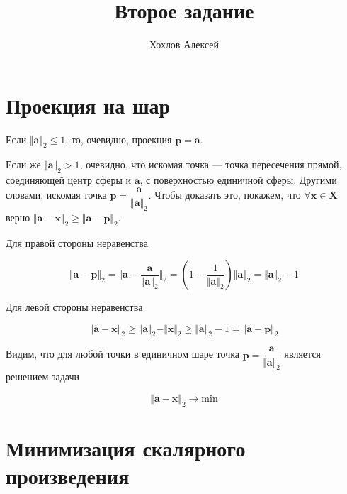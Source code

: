 
\title{Второе задание}
\author{
	Хохлов Алексей \\
}


	\maketitle
	

	\section{Проекция на шар}
	
	Если $\Vert \mathbf{a} \Vert_2 \leqslant 1$, то, очевидно, проекция $\mathbf{p} = \mathbf{a}$.
	
	Если же $\Vert \mathbf{a} \Vert_2 > 1$, очевидно, что искомая точка --- точка пересечения прямой, соединяющей центр сферы и $\mathbf{a}$, с поверхностью единичной сферы. Другими словами, искомая точка $\mathbf{p} = \dfrac{\mathbf{a}}{\Vert \mathbf{a} \Vert_2 }$. Чтобы доказать это, покажем, что $\forall \mathbf{x} \in \mathbf{X}  $ верно $\Vert \mathbf{a} - \mathbf{x} \Vert_2 \geqslant  \Vert \mathbf{a} - \mathbf{p} \Vert_2$.
	
	Для правой стороны неравенства
	
	\begin{equation}
	\Vert \mathbf{a} - \mathbf{p} \Vert_2 = \Vert \mathbf{a} - \frac{\mathbf{a}}{\Vert \mathbf{a} \Vert_2} \Vert_2 =  ( 1 - \frac{1}{\Vert \mathbf{a} \Vert_2}) \Vert \mathbf{a} \Vert_2  = \Vert \mathbf{a} \Vert_2 - 1
	\end{equation}
	
	Для левой стороны неравенства
	
	\begin{equation}
	\Vert \mathbf{a} - \mathbf{x} \Vert_2 \geqslant \Vert \mathbf{a} \Vert_2 - \Vert \mathbf{x} \Vert_2 \geqslant \Vert \mathbf{a} \Vert_2 - 1 = \Vert \mathbf{a} - \mathbf{p} \Vert_2
	\end{equation}
	
	Видим, что для любой точки в единичном шаре точка $\mathbf{p} = \dfrac{\mathbf{a}}{\Vert \mathbf{a} \Vert_2 }$ является решением задачи
	
	\begin{equation}
	\Vert \mathbf{a} - \mathbf{x} \Vert_2 \rightarrow \text{min}
	\end{equation}
	
	\section{Минимизация скалярного произведения}
	
